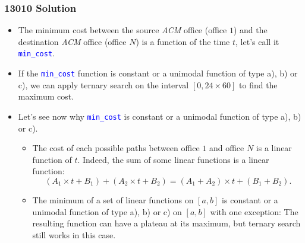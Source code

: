 \documentclass{beamer}
\begin{document}
\begin{frame}%
\frametitle{13010 Solution}

\footnotesize

\begin{itemize}

\item<1-> The minimum cost between the source \emph{ACM} office (office $1$) and the destination
\emph{ACM} office (office $N$) is a function of the time $t$, let's call it \textcolor{blue}{\texttt{min\_cost}}.

\vspace{0.15cm}

\item<2-> If the \textcolor{blue}{\texttt{min\_cost}} function is constant or a unimodal function of type a), b) or c), we can apply
ternary search on the interval $[0, 24\times60]$ to find the maximum cost.

\vspace{0.15cm}

\item<3-> Let's see now why \textcolor{blue}{\texttt{min\_cost}} is constant or a unimodal function of type a), b) or c).
\begin{itemize}
\footnotesize
\item<3-> The cost of each possible paths between office $1$ and office $N$ is a linear function of $t$. Indeed, the sum
of some linear functions is a linear function:
$$
(A_1\times t + B_1) + (A_2\times t + B_2) = (A_1 + A_2) \times t + (B_1 + B_2).
$$
\item<4-> The minimum of a set of linear functions on $[a,b]$ is constant or a unimodal function of type a), b) or c) on $[a,b]$ with one exception:
The resulting function can have a plateau at its maximum, but ternary search still works in this case.

\end{itemize}

\end{itemize}

\end{frame}

\end{document}
